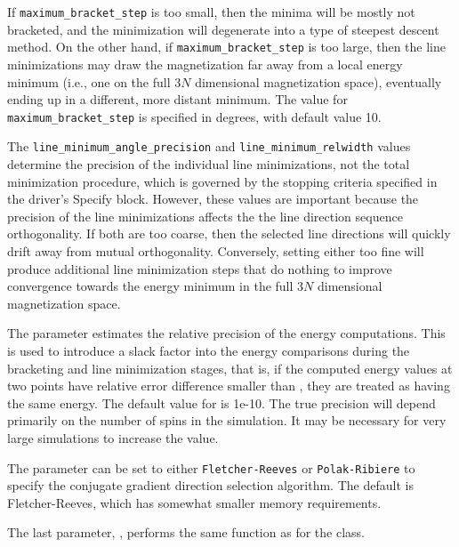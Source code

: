 \begin{description}
If \texttt{maximum\_bracket\_step} is too small, then the minima will be
mostly not bracketed, and the minimization will degenerate into a type
of steepest descent method.  On the other hand, if
\texttt{maximum\_bracket\_step} is too large, then the line
minimizations may draw the magnetization far away from a local energy
minimum (i.e., one on the full $3N$ dimensional magnetization space),
eventually ending up in a different, more distant minimum.  The value
for \texttt{maximum\_bracket\_step} is specified in degrees, with
default value 10.

The \texttt{line\_minimum\_angle\_precision} and
\texttt{line\_minimum\_relwidth} values determine the precision of the
individual line minimizations, not the total minimization procedure,
which is governed by the stopping criteria specified in the driver's
Specify block.  However, these values are important because the
precision of the line minimizations affects the the line direction
sequence orthogonality.  If both are too coarse, then the selected line
directions will quickly drift away from mutual orthogonality.
Conversely, setting either too fine will
produce additional line minimization steps that do nothing to improve
convergence towards the energy minimum in the full $3N$ dimensional
magnetization space.

The  parameter estimates the relative
precision of the energy computations.  This is used to introduce a slack
factor into the energy comparisons during the bracketing and line
minimization stages, that is, if the computed energy values at two
points have relative error difference smaller than
, they are treated as having the same energy.  The
default value for  is 1e-10.  The true precision
will depend primarily on the number of spins in the simulation.  It may
be necessary for very large simulations to increase the
 value.

The  parameter can be set to either
\texttt{Fletcher-Reeves} or \texttt{Polak-Ribiere} to specify the
conjugate gradient direction selection algorithm.  The default is
Fletcher-Reeves, which has somewhat smaller memory requirements.

The last parameter, , performs the same function
as for the  class.


\end{description}
